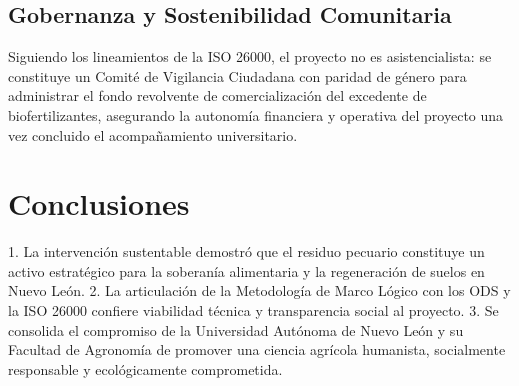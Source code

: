 \subsection{Gobernanza y Sostenibilidad Comunitaria}
Siguiendo los lineamientos de la ISO 26000, el proyecto no es asistencialista: se constituye un Comité de Vigilancia Ciudadana con paridad de género para administrar el fondo revolvente de comercialización del excedente de biofertilizantes, asegurando la autonomía financiera y operativa del proyecto una vez concluido el acompañamiento universitario.

\section{Conclusiones}
1. La intervención sustentable demostró que el residuo pecuario constituye un activo estratégico para la soberanía alimentaria y la regeneración de suelos en Nuevo León.
2. La articulación de la Metodología de Marco Lógico con los ODS y la ISO 26000 confiere viabilidad técnica y transparencia social al proyecto.
3. Se consolida el compromiso de la Universidad Autónoma de Nuevo León y su Facultad de Agronomía de promover una ciencia agrícola humanista, socialmente responsable y ecológicamente comprometida.

